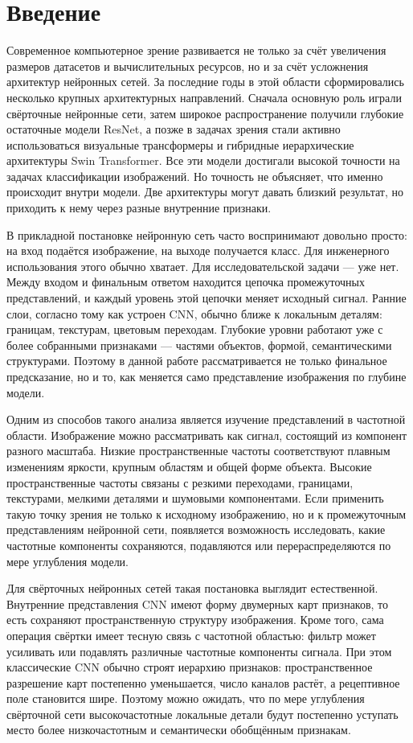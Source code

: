 \chapter{Введение}

Современное компьютерное зрение развивается не только за счёт увеличения размеров датасетов и вычислительных ресурсов, но и за счёт усложнения архитектур нейронных сетей. За последние годы в этой области сформировались несколько крупных архитектурных направлений. Сначала основную роль играли свёрточные нейронные сети, затем широкое распространение получили глубокие остаточные модели ResNet, а позже в задачах зрения стали активно использоваться визуальные трансформеры и гибридные иерархические архитектуры Swin Transformer. Все эти модели достигали высокой точности на задачах классификации изображений. Но точность не объясняет, что именно происходит внутри модели. Две архитектуры могут давать близкий результат, но приходить к нему через разные внутренние признаки.

В прикладной постановке нейронную сеть часто воспринимают довольно просто: на вход подаётся изображение, на выходе получается класс. Для инженерного использования этого обычно хватает. Для исследовательской задачи — уже нет. Между входом и финальным ответом находится цепочка промежуточных представлений, и каждый уровень этой цепочки меняет исходный сигнал. Ранние слои, согласно тому как устроен CNN, обычно ближе к локальным деталям: границам, текстурам, цветовым переходам. Глубокие уровни работают уже с более собранными признаками — частями объектов, формой, семантическими структурами. Поэтому в данной работе рассматривается не только финальное предсказание, но и то, как меняется само представление изображения по глубине модели.

Одним из способов такого анализа является изучение представлений в частотной области. Изображение можно рассматривать как сигнал, состоящий из компонент разного масштаба. Низкие пространственные частоты соответствуют плавным изменениям яркости, крупным областям и общей форме объекта. Высокие пространственные частоты связаны с резкими переходами, границами, текстурами, мелкими деталями и шумовыми компонентами. Если применить такую точку зрения не только к исходному изображению, но и к промежуточным представлениям нейронной сети, появляется возможность исследовать, какие частотные компоненты сохраняются, подавляются или перераспределяются по мере углубления модели.

Для свёрточных нейронных сетей такая постановка выглядит естественной. Внутренние представления CNN имеют форму двумерных карт признаков, то есть сохраняют пространственную структуру изображения. Кроме того, сама операция свёртки имеет тесную связь с частотной областью: фильтр может усиливать или подавлять различные частотные компоненты сигнала. При этом классические CNN обычно строят иерархию признаков: пространственное разрешение карт постепенно уменьшается, число каналов растёт, а рецептивное поле становится шире. Поэтому можно ожидать, что по мере углубления свёрточной сети высокочастотные локальные детали будут постепенно уступать место более низкочастотным и семантически обобщённым признакам.

